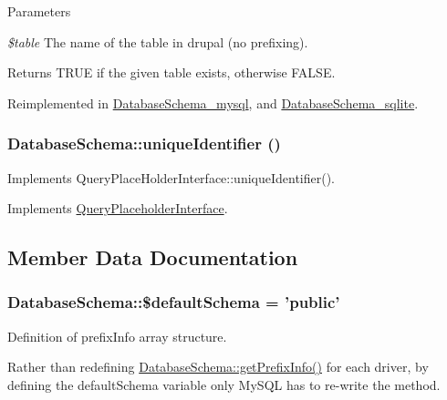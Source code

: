 \begin{DoxyParams}{Parameters}
\item[{\em \$table}]The name of the table in drupal (no prefixing).\end{DoxyParams}
\begin{DoxyReturn}{Returns}
TRUE if the given table exists, otherwise FALSE. 
\end{DoxyReturn}


Reimplemented in \hyperlink{classDatabaseSchema__mysql_a3590c4ea18bb4d950f1595370f4ae211}{DatabaseSchema\_\-mysql}, and \hyperlink{classDatabaseSchema__sqlite_a8799172b7c34295d232f0335af6ddc08}{DatabaseSchema\_\-sqlite}.\hypertarget{classDatabaseSchema_a50324931213b40d68037c184a0061cf0}{
\subsubsection[{uniqueIdentifier}]{\setlength{\rightskip}{0pt plus 5cm}DatabaseSchema::uniqueIdentifier ()}}
\label{classDatabaseSchema_a50324931213b40d68037c184a0061cf0}
Implements QueryPlaceHolderInterface::uniqueIdentifier(). 

Implements \hyperlink{interfaceQueryPlaceholderInterface_a5f4eb118f1894f0b5785d78d4dbe9847}{QueryPlaceholderInterface}.

\subsection{Member Data Documentation}
\hypertarget{classDatabaseSchema_ad1b406aa6605327a3f5c910e0fd37816}{
\subsubsection[{\$defaultSchema}]{\setlength{\rightskip}{0pt plus 5cm}DatabaseSchema::\$defaultSchema = 'public'}}
\label{classDatabaseSchema_ad1b406aa6605327a3f5c910e0fd37816}
Definition of prefixInfo array structure.

Rather than redefining \hyperlink{classDatabaseSchema_a8acae6a4bd3e5ba89aaddc8133927ee2}{DatabaseSchema::getPrefixInfo()} for each driver, by defining the defaultSchema variable only MySQL has to re-\/write the method.

